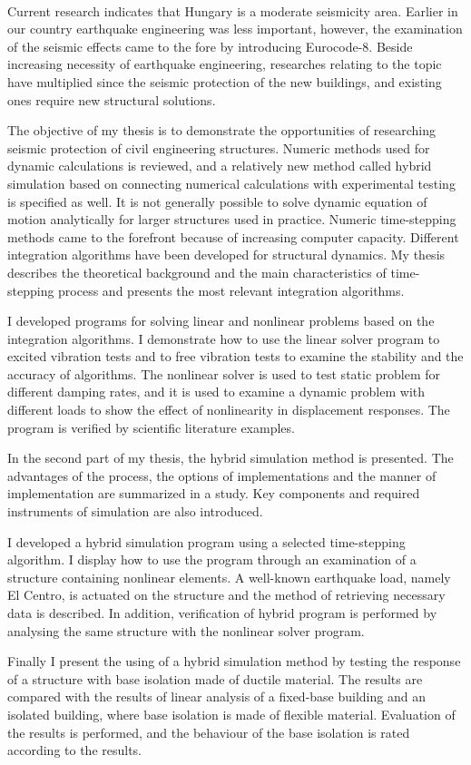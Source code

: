 

{\ }

Current research indicates that Hungary is a moderate seismicity area. Earlier in our country earthquake engineering was less important, however, the examination of the seismic effects came to the fore by introducing Eurocode-8. Beside increasing necessity of earthquake engineering, researches relating to the topic have multiplied since  the seismic protection of the new buildings, and existing ones require new structural solutions.

The objective of my thesis is to demonstrate the  opportunities of researching seismic protection of civil engineering structures. Numeric methods used for dynamic calculations is reviewed, and a relatively new method called hybrid simulation  based on connecting numerical calculations with experimental testing is specified as well. 
It is  not generally possible to solve dynamic equation of motion  analytically for larger structures used in practice. Numeric time-stepping methods came to the forefront because of increasing computer capacity. Different integration  algorithms have been developed for structural dynamics. My thesis describes the theoretical background and  the main characteristics of time-stepping process and presents the most relevant integration algorithms.

I developed programs for solving linear and nonlinear problems based on the integration algorithms. I demonstrate how to use the linear solver program to excited vibration tests and to free vibration tests  to examine  the stability and the accuracy of algorithms. The nonlinear solver is used to  test static problem for different damping rates, and it is used to examine a dynamic problem with different loads to show the effect of nonlinearity in displacement  responses. The program is verified by scientific literature examples.

In the second part of my thesis, the hybrid simulation method is presented. The advantages of the process, the options of implementations and the manner of implementation  are summarized in a study. Key components and required instruments  of  simulation  are also introduced.
 
I developed a hybrid simulation program using a selected time-stepping algorithm.  I display  how to use the program through an examination of a  structure containing nonlinear elements. A well-known earthquake load,  namely El Centro, is actuated on the structure and the method of retrieving  necessary data is described. In addition, verification of hybrid program is performed by analysing the same structure with the nonlinear solver program.

Finally  I present the using of  a hybrid simulation method by testing the response of a structure with  base isolation made of ductile material. The results are compared with the results of linear analysis of a fixed-base building and  an isolated building, where base isolation is made of flexible material. Evaluation of the results is performed, and the behaviour of the base isolation is rated according to the results.


